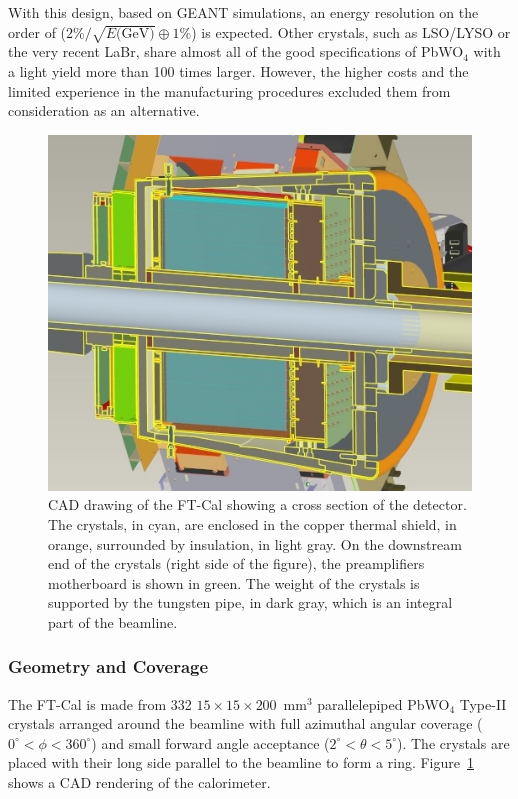 With this design, based on GEANT simulations, an energy resolution on the order of
($2\% /\sqrt{E\textrm{(GeV)}} \oplus 1\%$) is expected. Other crystals, such as LSO/LYSO or the very recent
LaBr, share almost all of the good specifications of PbWO$_4$ with a light yield more than 100 times larger.
However, the higher costs and the limited experience in the manufacturing procedures excluded them from
consideration as an alternative.

\begin{figure}[th!]
\centering 
\includegraphics[width=\columnwidth]{fig/section.jpg} 
\caption{CAD drawing of the FT-Cal showing a cross section of the detector. The crystals, in cyan, are enclosed in
  the copper thermal shield, in orange, surrounded by insulation, in light gray. On the downstream end of the
  crystals (right side of the figure), the preamplifiers motherboard is shown in green. The weight of the crystals is supported
  by the tungsten pipe, in dark gray, which is an integral part of the beamline.}
\label{fig:ft-cal-geometry} 
\end{figure}

\subsubsection{Geometry and Coverage}

The FT-Cal is made from 332 $15\times 15\times 200$~mm$^3$ parallelepiped PbWO$_4$ Type-II crystals
arranged around the beamline with full azimuthal angular coverage ($0^\circ < \phi < 360^\circ$)  and small
forward angle acceptance ($2^\circ < \theta < 5^\circ$). The crystals are placed with their long side parallel to
the beamline to form a ring. Figure~\ref{fig:ft-cal-geometry} shows a CAD rendering of the calorimeter. 

